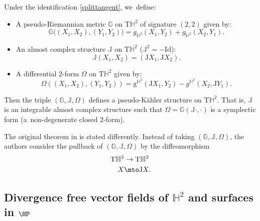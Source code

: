 \begin{theorem}\label{canonical_pseudo}
Under the identification \eqref{splittangent}, we~define:
\begin{itemize}
\item A pseudo-Riemannian metric $\mathbb{G}$ on $\mathrm{T}\mathbb{H}^2$ of signature $(2,2)$ given by:
\[
\mathbb{G}\big((X_1,X_2),(Y_1,Y_2)\big)=g_{\mathbb{H}^2}(X_1,Y_2)+g_{\mathbb{H}^2}(X_2,Y_1).
\]
\item An almost complex structure $\mathbb{J}$ on $\mathrm{T}\mathbb{H}^2$ (\ie $\mathbb{J}^2=-\mathrm{Id}$):
\[
\mathbb{J}(X_1,X_2)=(\mathrm{J}X_1,\mathrm{J}X_2).
\]
\item A differential $2$-form $\Omega$ on $\mathrm{T}\mathbb{H}^2$ given by:
\[
\Omega((X_1,X_2),(Y_1,Y_2))=\mathrm{g}^{\mathbb{H}^2}(\mathrm{J}X_1,Y_2)-g^{\mathbb{H}^{2}}(X_2,\mathrm{J}Y_1).
\]
\end{itemize}
Then the triple $(\mathbb{G},\mathbb{J},\Omega)$ defines a pseudo-Kähler structure on $\mathrm{T}\mathbb{H}^2$. That is, $\mathbb{J}$ is an integrable almost complex structure such that $\Omega=\mathbb{G}(\mathbb{J}\cdot,\cdot)$ is a symplectic form (a~non-degenerate closed $2$-form).
\end{theorem}
\begin{remark}
The original theorem in \cite{canonical_pseudo} is stated differently. Instead of taking $(\mathbb{G},\mathbb{J},\Omega)$, the authors consider the pullback of $(\mathbb{G},\mathbb{J},\Omega)$ by the diffeomorphism
\[
\begin{aligned}
\mathrm{T}\mathbb{H}^2 & \to \mathrm{T}\mathbb{H}^2 \\
X & \mto \mathrm{J}X.
\end{aligned}
\]
\end{remark}

\subsection{Divergence free vector fields of \texorpdfstring{$\mathbb{H}^2$}{H2}
and surfaces in \texorpdfstring{$\HP$}{HP}}

